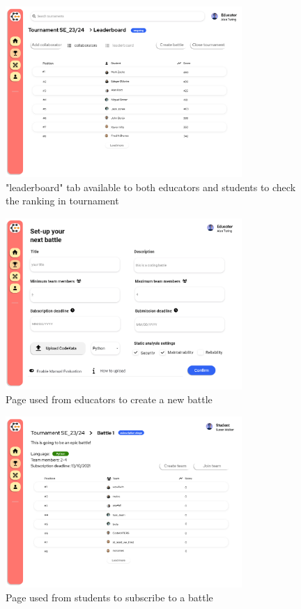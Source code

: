 \begin{figure}[H]
    \centering
    \includegraphics[width=0.8\textwidth]{Mockups/8_educator_tournament_leaderboard.png}
    \caption{"leaderboard" tab available to both educators and students to check the ranking in tournament}
\end{figure}

\begin{figure}[H]
    \centering
    \includegraphics[width=0.8\textwidth]{Mockups/10_educator_create_battle.png}
    \caption{Page used from educators to create a new battle}
\end{figure}

\begin{figure}[H]
    \centering
    \includegraphics[width=0.8\textwidth]{Mockups/11_student_battle_subscription.png}
    \caption{Page used from students to subscribe to a battle}
\end{figure}

